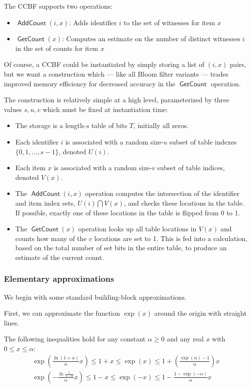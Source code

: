 \documentclass[letterpaper,12pt]{article}
\DeclareMathOperator{\AddCount}{\textsf{AddCount}}
\DeclareMathOperator{\GetCount}{\textsf{GetCount}}
\begin{document}
The CCBF supports two operations:
\begin{itemize}
  \item $\AddCount(i,x)$: Adds identifier $i$ to the set of witnesses for item $x$
  \item $\GetCount(x)$: Computes an estimate on the number of distinct
    witnesses $i$ in the set of counts for item $x$
\end{itemize}

Of course, a CCBF could be instantiated by simply storing a list of
$(i,x)$ pairs, but we want a construction which --- like all Bloom
filter variants --- trades improved memory efficiency for decreased
accuracy in the $\GetCount$ operation.

The construction is relatively simple at a high level, parameterized by
three values $s,u,v$ which must be fixed at instantiation time:
\begin{itemize}
  \item The storage is a length-$s$ table of bits $T$, initially all zeros.
  \item Each identifier $i$ is associated with a random size-$u$ subset
    of table indexes $\{0,1,\ldots,s-1\}$, denoted $U(i)$.
  \item Each item $x$ is associated with a random size-$v$ subset of
    table indices, denoted $V(x)$.
  \item The $\AddCount(i,x)$ operation computes the intersection of the
    identifier and item index sets, $U(i)\bigcap V(x)$, and checks these
    locations in the table. If possible, exactly one of these locations
    in the table is flipped from 0 to 1.
  \item The $\GetCount(x)$ operation looks up all table locations in
    $V(x)$ and counts how many of the $v$ locations are set to 1. This
    is fed into a calculation, based on the total number of set bits in
    the entire table, to produce an estimate of the current count.
\end{itemize}

\subsubsection{Elementary approximations}

We begin with some standard building-block approximations.

First, we can approximate the function $\exp(x)$ around the origin
with straight lines.

The following inequalities hold for any constant $\alpha\ge 0$ and any
real $x$ with $0\le x \le \alpha$:
\begin{eqnarray}
  \exp\left(\frac{\ln(1+\alpha)}{\alpha} x\right)
  \le 1 + x
  \le \exp(x)
  \le 1 + \left(\frac{\exp(\alpha)-1}{\alpha}\right) x
  \label{eqn:inequal-pos}
\\[15 pt]
  \exp\left(-\frac{\ln\frac{1}{1-\alpha}}{\alpha} x\right)
  \le 1 - x
  \le \exp(-x)
  \le 1 - \frac{1 - \exp(-\alpha)}{\alpha} x
  \label{eqn:inequal-neg}
\end{eqnarray}
\end{document}
